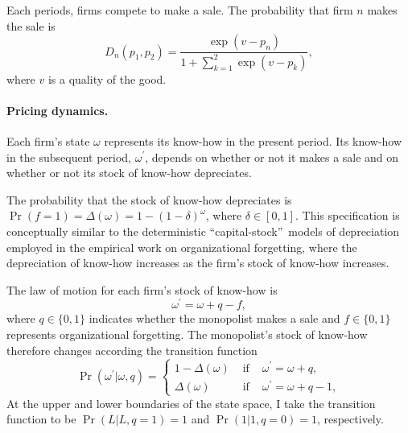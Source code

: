 \documentclass[11pt]{article}
\begin{document}
Each periods, firms compete to make a sale.  The probability that firm $n$ makes the sale is
\begin{equation*}
D_{n}(p_{1},p_{2})=\frac{\exp \left( v-p_{n}\right) }{1+\sum_{k=1}^2\exp\left(
v-p_{k}\right)  },
\end{equation*}%
where $v$ is a quality of the good.

\paragraph{Pricing dynamics.}

Each firm's state $\omega $ represents its know-how in the
present period. Its know-how in the subsequent period,
$\omega^\prime$, depends on whether or not it makes a sale and on
whether or not its stock of know-how depreciates.

The probability that the stock of know-how depreciates is $\Pr(f=1)=\Delta
(\omega)=1-(1-\delta)^{\omega}$, where $\delta \in [0,1]$. This
specification is conceptually similar to the deterministic
\textquotedblleft capital-stock\textquotedblright\ models of
depreciation employed in the empirical work on organizational
forgetting, where the depreciation
of know-how increases as the firm's stock of know-how increases.

The law of motion for each firm's
stock of know-how is
$$
\omega^\prime=\omega+q-f,
$$
where $q\in\{0,1\}$ indicates whether the monopolist makes a sale and
$f\in\{0,1\}$ represents organizational forgetting.
The monopolist's
stock of know-how therefore changes according the transition function
\begin{equation*}
\Pr (\omega^{\prime }|\omega,q)=\left\{
\begin{array}{cll}
1-\Delta (\omega) & \mbox{ if } & \omega^{\prime
}=\omega+q, \\
\Delta (\omega) & \mbox{ if } & \omega^{\prime
}=\omega+q-1,%
\end{array}
\right.
\end{equation*}
At the upper and lower boundaries of the state space, I take the
transition function to be $\Pr (L|L,q=1)=1$ and $\Pr (1|1,q=0)=1$,
respectively.
\end{document}
